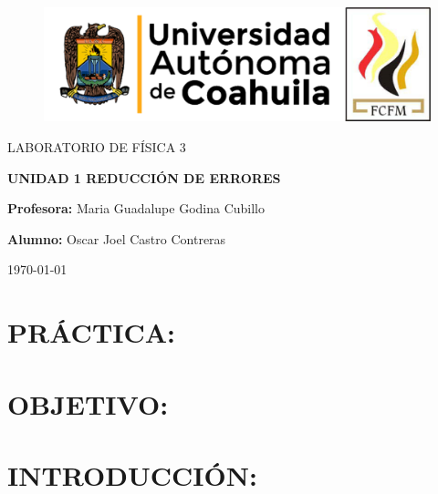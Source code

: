 \documentclass{article}
\begin{document}
		
		\begin{titlepage}
		
			\centering
			{\bfseries
			\begin{figure}[h!]
	
				\centering
				\includegraphics[width=\linewidth]{Nom_UAdeC_FCFM.png}  						
			\end{figure}
			\par}
			\vspace{2cm}
			{\scshape\LARGE LABORATORIO DE FÍSICA 3 \par}
			\vspace{3cm}
			{\scshape\Huge \textbf{UNIDAD 1 REDUCCIÓN DE ERRORES} \par}
			\vfill
			{\LARGE \textbf{Profesora:} Maria Guadalupe Godina Cubillo \par}
			\vspace{3cm}
			{\LARGE \textbf{Alumno:} Oscar Joel Castro Contreras \par}
			\vfill
			{\Large \today \par}
			\thispagestyle{empty}
			
		\end{titlepage}
	
		\newpage
		
		\tableofcontents		
		
		\newpage		
		
		\section{PRÁCTICA:}\label{sec:PRÁCTICA}
		
		\section{OBJETIVO:}\label{sec:OBJETIVO}
		
		\section{INTRODUCCIÓN:}\label{sec:INTRODUCCIÓN}
		
\end{document}
